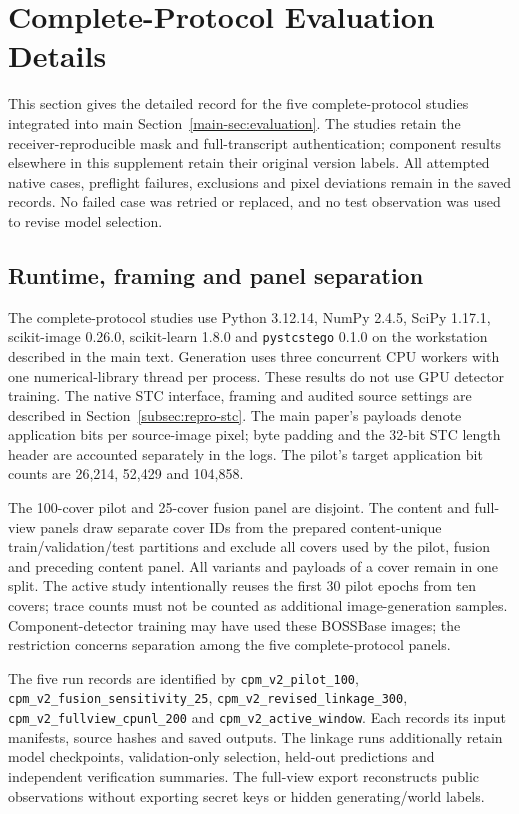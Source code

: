 \documentclass[journal]{IEEEtran}
\theoremstyle{definition}
\theoremstyle{game}
\begin{document}
\makeatletter
\setlength{\@fptop}{0pt}
\setlength{\@dblfptop}{0pt}
\setlength{\@fpsep}{12pt plus 2pt minus 2pt}
\setlength{\@dblfpsep}{12pt plus 2pt minus 2pt}
\makeatother
\section{Complete-Protocol Evaluation Details}
\label{sec:revision-details}

This section gives the detailed record for the five complete-protocol
studies integrated into main Section~\ref{main-sec:evaluation}.
The studies retain the receiver-reproducible mask and full-transcript
authentication; component results elsewhere in this supplement
retain their original version labels. All attempted native cases,
preflight failures, exclusions and pixel deviations remain in the saved
records. No failed case was retried or replaced, and no test observation
was used to revise model selection.

\subsection{Runtime, framing and panel separation}
The complete-protocol studies use Python 3.12.14, NumPy 2.4.5,
SciPy 1.17.1, scikit-image 0.26.0, scikit-learn 1.8.0 and
\texttt{pystcstego} 0.1.0 on the workstation described in the main text.
Generation uses three concurrent CPU workers with one numerical-library
thread per process. These results do not use GPU detector training.
The native STC interface, framing and audited source settings are
described in Section~\ref{subsec:repro-stc}. The main paper's payloads
denote application bits per source-image pixel; byte padding and the
32-bit STC length header are accounted separately in the logs. The
pilot's target application bit counts are 26,214, 52,429 and 104,858.

The 100-cover pilot and 25-cover fusion panel are disjoint. The content
and full-view panels draw separate cover IDs from the prepared
content-unique train/validation/test partitions and exclude all covers
used by the pilot, fusion and preceding content panel. All variants and payloads of a cover
remain in one split. The active study intentionally reuses the first
30 pilot epochs from ten covers; trace counts must not be counted as
additional image-generation samples. Component-detector training may have
used these BOSSBase images; the restriction concerns separation among the
five complete-protocol panels.

The five run records are identified by
\nolinkurl{cpm_v2_pilot_100},
\nolinkurl{cpm_v2_fusion_sensitivity_25},
\nolinkurl{cpm_v2_revised_linkage_300},
\nolinkurl{cpm_v2_fullview_cpunl_200} and
\nolinkurl{cpm_v2_active_window}.
Each records its input manifests, source hashes and saved outputs.
The linkage runs additionally retain model checkpoints, validation-only
selection, held-out predictions and independent verification summaries.
The full-view export reconstructs public observations without exporting
secret keys or hidden generating/world labels.
\end{document}
